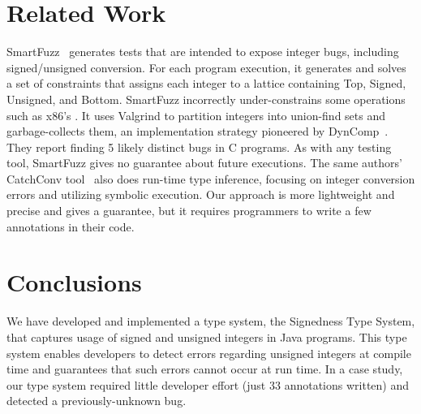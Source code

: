 \documentclass{sig-alternate-05-2015}
\def\<#1>{\codeid{#1}}
\begin{document}
\section{Related Work}

SmartFuzz~\cite{MolnarLW2009} generates tests that are intended to expose
integer bugs, including signed/unsigned conversion.  For each program
execution, it generates and solves a set of constraints that assigns each
integer to a lattice containing Top, Signed, Unsigned, and Bottom.
SmartFuzz incorrectly under-constrains some operations such as x86's
\<IMUL>.  It uses Valgrind to partition integers into union-find sets and
garbage-collects them, an implementation strategy pioneered by
DynComp~\cite{GuoPME2006}.  They report finding 5 likely distinct bugs in C
programs.  As with any testing tool, SmartFuzz gives no guarantee about
future executions.  The same authors' CatchConv tool~\cite{MolnarW2007}
also does run-time type inference, focusing on integer conversion errors
and utilizing symbolic execution.  Our approach is more lightweight and
precise and gives a guarantee, but it requires programmers to write a few
annotations in their code.


\section{Conclusions}

We have developed and implemented a type system, the Signedness Type System, that
captures usage of signed and unsigned
integers in Java programs.
This type system enables developers to detect errors regarding unsigned
integers at compile time and guarantees that such errors cannot occur at
run time.
In a case study, our type system required little developer effort (just 33
annotations written) and detected a
previously-unknown bug.

\newpage


\end{document}
